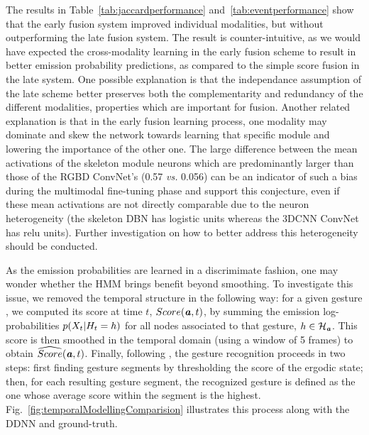 %
The results in Table~\ref{tab:jaccardperformance} and~\ref{tab:eventperformance} show that the early fusion system
improved individual modalities, but without outperforming the late fusion system.
%
The result is counter-intuitive, as we would have expected the cross-modality learning in the early fusion scheme
to result in better emission probability predictions, as compared to the simple score fusion in the late system.
%
One possible explanation is that the independance assumption of the late scheme better preserves both
the complementarity and redundancy of the different modalities, properties which are important for fusion.
%
Another related explanation is that in the early fusion learning process,
one modality may dominate and  skew the network towards  learning that specific module and
lowering the importance of the other one.
%
The large difference between the mean activations of the  skeleton module neurons which are predominantly larger than those of the
RGBD ConvNet's (0.57 \emph{vs.} 0.056) can be an indicator of such a bias during the multimodal fine-tuning phase and
support this conjecture, even if these mean activations are not directly comparable
due to the neuron heterogeneity (the skeleton DBN has logistic units whereas the 3DCNN ConvNet has relu units).
%
Further investigation on how to better address this heterogeneity should be conducted.


%

%
As the emission probabilities are learned in a discrimimate fashion, one may wonder whether the HMM brings benefit beyond smoothing.
To investigate this issue, we removed the temporal structure in the following way:
for a given gesture \gesturea, we computed its score at time $t$, $Score(\textbf{\emph{a}},t)$, by summing the emission
log-probabilities $p(X_t|H_t = h)$ for all nodes associated to that gesture,
\ie $h \in \mathcal{H}_{\textbf{\emph{a}}}$.
%
This score is then smoothed in the temporal domain (using a window of 5 frames) to obtain $\widehat{Score}(\textbf{\emph{a}},t)$.
%
Finally, following \cite{neverova2014moddrop}, the gesture recognition proceeds in two steps:
first finding gesture segments by thresholding the score of the ergodic state;
then, for each resulting gesture segment, the recognized gesture is defined as the one whose average score within the segment is the highest.
%
Fig.~\ref{fig:temporalModellingComparision} illustrates this process along with the DDNN and ground-truth.

